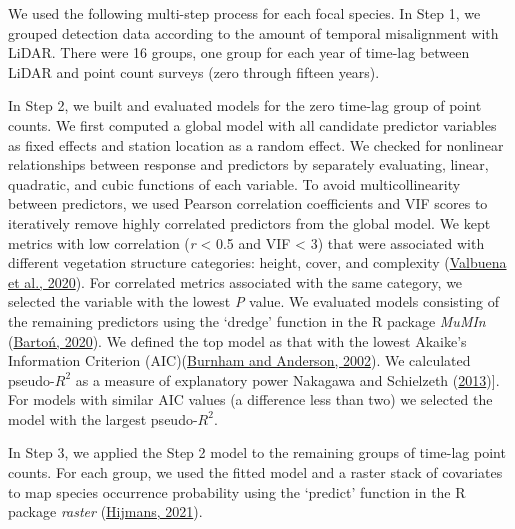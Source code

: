 \documentclass[
  12pt,
]{article}
\begin{document}
We used the following multi-step process for each focal species. In Step 1, we grouped detection data according to the amount of temporal misalignment with LiDAR. There were 16 groups, one group for each year of time-lag between LiDAR and point count surveys (zero through fifteen years).

In Step 2, we built and evaluated models for the zero time-lag group of point counts. We first computed a global model with all candidate predictor variables as fixed effects and station location as a random effect. We checked for nonlinear relationships between response and predictors by separately evaluating, linear, quadratic, and cubic functions of each variable. To avoid multicollinearity between predictors, we used Pearson correlation coefficients and VIF scores to iteratively remove highly correlated predictors from the global model. We kept metrics with low correlation (\emph{r} \textless{} 0.5 and VIF \textless{} 3) that were associated with different vegetation structure categories: height, cover, and complexity (\protect\hyperlink{ref-valbuenaStandardizingEcosystemMorphological2020}{Valbuena et al., 2020}). For correlated metrics associated with the same category, we selected the variable with the lowest \emph{P} value. We evaluated models consisting of the remaining predictors using the `dredge' function in the R package \emph{MuMIn} (\protect\hyperlink{ref-bartonMuMInMultimodelInference2020}{Bartoń, 2020}). We defined the top model as that with the lowest Akaike's Information Criterion (AIC)(\protect\hyperlink{ref-burnhamModelSelectionMultimodel2002}{Burnham and Anderson, 2002}). We calculated pseudo-\(R^2\) as a measure of explanatory power Nakagawa and Schielzeth (\protect\hyperlink{ref-nakagawaGeneralSimpleMethod2013}{2013}){]}. For models with similar AIC values (a difference less than two) we selected the model with the largest pseudo-\(R^2\).

In Step 3, we applied the Step 2 model to the remaining groups of time-lag point counts. For each group, we used the fitted model and a raster stack of covariates to map species occurrence probability using the `predict' function in the R package \emph{raster} (\protect\hyperlink{ref-hijmansRasterGeographicData2021}{Hijmans, 2021}).
\end{document}
